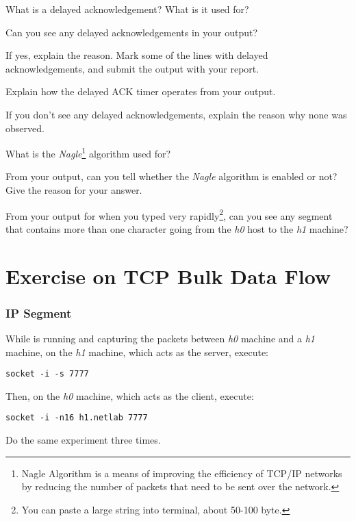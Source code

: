\documentclass{../UTNetLab}
\begin{document}
    \begin{report}
        \item What is a delayed acknowledgement?
            What is it used for?
        
        \item Can you see any delayed acknowledgements in your  output?

            If yes, explain the reason.
            Mark some of the lines with delayed acknowledgements, and submit the  output with your report.

            Explain how the delayed ACK timer operates from your  output.

            If you don’t see any delayed acknowledgements, explain the reason why none was observed.
        
        \item What is the \textit{Nagle}\footnote{Nagle Algorithm is a means of improving the efficiency of TCP/IP networks by reducing the number of packets that need to be sent over the network.} algorithm used for?

            From your  output, can you tell whether the \textit{Nagle} algorithm is enabled or not? Give the reason for your answer.

            From your  output for when you typed very rapidly\footnote{You can paste a large string into terminal, about 50-100 byte.}, can you see any segment that contains more than one character going from the \textit{h0} host to the \textit{h1} machine?
    \end{report}

\part{Exercise on TCP Bulk Data Flow}
\section{IP Segment}
    While  is running and capturing the packets between \textit{h0} machine and a \textit{h1} machine, on the \textit{h1} machine, which acts as the server, execute:
    \begin{lstlisting}
socket -i -s 7777
    \end{lstlisting}
    Then, on the \textit{h0} machine, which acts as the client, execute:
    \begin{lstlisting}[emph={h1,netlab}]
socket -i -n16 h1.netlab 7777
    \end{lstlisting}
    Do the same experiment three times.
\end{document}
